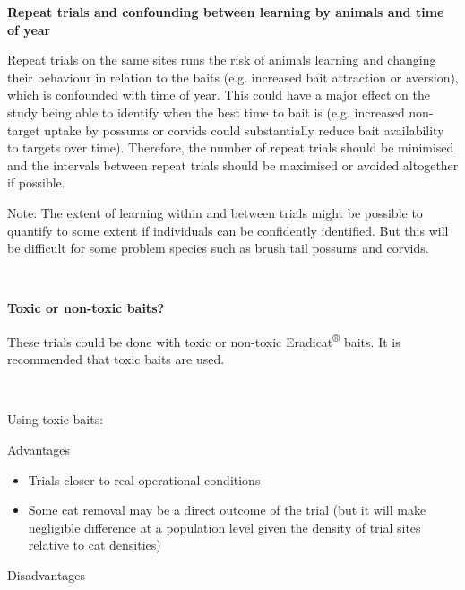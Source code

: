 \documentclass[version=last,
    paper=a4,                               %
    10pt,                                   %
    dvipsnames,
    oneside,                              %
    headings=openany,                       %
    open=any,
    BCOR=7mm,                               %
    DIV=15,     %
]{scrbook}
\begin{document}
\textbf{Repeat trials and confounding between learning by animals and
time of year}

Repeat trials on the same sites runs the risk of animals learning and
changing their behaviour in relation to the baits (e.g. increased bait
attraction or aversion), which is confounded with time of year. This
could have a major effect on the study being able to identify when the
best time to bait is (e.g. increased non-target uptake by possums or
corvids could substantially reduce bait availability to targets over
time). Therefore, the number of repeat trials should be minimised and
the intervals between repeat trials should be maximised or avoided
altogether if possible.

Note: The extent of learning within and between trials might be possible
to quantify to some extent if individuals can be confidently identified.
But this will be difficult for some problem species such as brush tail
possums and corvids.

~

\textbf{Toxic or non-toxic baits?}

These trials could be done with toxic or non-toxic
Eradicat\textsuperscript{®} baits. It is recommended that toxic baits
are used.

~

Using toxic baits:

Advantages

\begin{itemize}
\itemsep1pt\parskip0pt
\item
  Trials closer to real operational conditions
\item
  Some cat removal may be a direct outcome of the trial (but it will
  make negligible difference at a population level given the density of
  trial sites relative to cat densities)
\end{itemize}

Disadvantages
\end{document}
